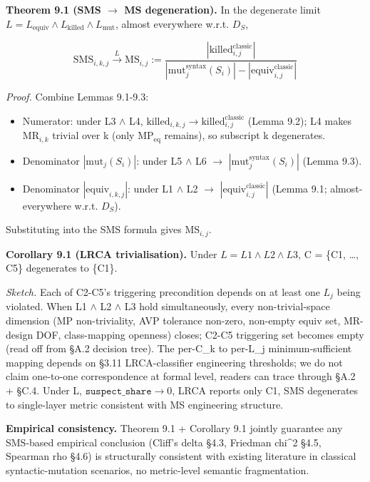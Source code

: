 \documentclass[acmsmall,screen,review]{acmart}
\providecommand{\tightlist}{\setlength{\itemsep}{0pt}\setlength{\parskip}{0pt}}
\begin{document}
\textbf{Theorem 9.1 (SMS $\to$ MS degeneration).} In the degenerate limit
$L = L_{\mathrm{equiv}} \wedge L_{\mathrm{killed}} \wedge L_{\mathrm{mut}}$, almost everywhere
w.r.t. $D_S$,

\[ \mathrm{SMS}_{i,k,j} \xrightarrow{L} \mathrm{MS}_{i,j} := \frac{|\mathrm{killed}_{i,j}^{\mathrm{classic}}|}{|\mathrm{mut}_j^{\mathrm{syntax}}(S_i)| - |\mathrm{equiv}_{i,j}^{\mathrm{classic}}|} \]

\emph{Proof.} Combine Lemmas 9.1-9.3:

\begin{itemize}
\tightlist
\item
  Numerator: under L3 $\wedge$ L4, $\mathrm{killed}_{i,k,j} \to
  \mathrm{killed}_{i,j}^{\mathrm{classic}}$ (Lemma 9.2); L4 makes $\mathrm{MR}_{i,k}$ trivial
  over k (only $\mathrm{MP}_{\mathrm{eq}}$ remains), so subscript k degenerates.
\item
  Denominator $|\mathrm{mut}_j(S_i)|$: under L5 $\wedge$ L6 $\to$
  $|\mathrm{mut}_j^{\mathrm{syntax}}(S_i)|$ (Lemma 9.3).
\item
  Denominator $|\mathrm{equiv}_{i,k,j}|$: under L1 $\wedge$ L2 $\to$
  $|\mathrm{equiv}_{i,j}^{\mathrm{classic}}|$ (Lemma 9.1;
  almost-everywhere w.r.t. $D_S$).
\end{itemize}

Substituting into the SMS formula gives $\mathrm{MS}_{i,j}$.

\textbf{Corollary 9.1 (LRCA trivialisation).} Under $L = L1 \wedge L2 \wedge L3$, C
= \{C1, \ldots, C5\} degenerates to \{C1\}.

\emph{Sketch.} Each of C2-C5's triggering precondition depends on at
least one $L_j$ being violated. When L1 $\wedge$ L2 $\wedge$ L3 hold simultaneously,
every non-trivial-space dimension (MP non-triviality, AVP tolerance
non-zero, non-empty equiv set, MR-design DOF, class-mapping openness)
closes; C2-C5 triggering set becomes empty (read off from §A.2 decision
tree). The per-C\_k to per-L\_j minimum-sufficient mapping depends on
§3.11 LRCA-classifier engineering thresholds; we do not claim one-to-one
correspondence at formal level, readers can trace through §A.2 + §C.4.
Under L, $\texttt{suspect\_share} \to 0$, LRCA reports only C1, SMS degenerates to
single-layer metric consistent with \citet{d7c38286734419b52de4262c9802ebdfcf4b9447} MS engineering
structure.

\textbf{Empirical consistency.} Theorem 9.1 + Corollary 9.1 jointly
guarantee any SMS-based empirical conclusion (Cliff's delta §4.3,
Friedman chi\^{}2 §4.5, Spearman rho §4.6) is structurally consistent
with existing \citet{d7c38286734419b52de4262c9802ebdfcf4b9447} literature in classical
syntactic-mutation scenarios, no metric-level semantic fragmentation.
\end{document}
